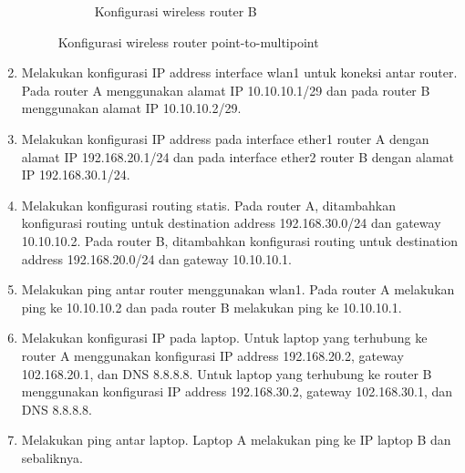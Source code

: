 \begin{enumerate}
\begin{figure}[H]
\begin{subfigure}[b]{0.4\linewidth}
			\caption{Konfigurasi wireless router B\label{fig:konfigurasiR2}}
		\end{subfigure}
		\caption{Konfigurasi wireless router point-to-multipoint}
		\hspace{1cm}
	\end{figure}
	\item Melakukan konfigurasi IP address interface wlan1 untuk koneksi antar router. Pada router A menggunakan alamat IP 10.10.10.1/29 dan pada router B menggunakan alamat IP 10.10.10.2/29.
	
	\item Melakukan konfigurasi IP address pada interface ether1 router A dengan alamat IP 192.168.20.1/24 dan pada interface ether2 router B dengan alamat IP 192.168.30.1/24.
	\item Melakukan konfigurasi routing statis. Pada router A, ditambahkan konfigurasi routing untuk destination address 192.168.30.0/24 dan gateway 10.10.10.2. Pada router B, ditambahkan konfigurasi routing untuk destination address 192.168.20.0/24 dan gateway 10.10.10.1.
	\item Melakukan ping antar router menggunakan wlan1. Pada router A melakukan ping ke 10.10.10.2 dan pada router B melakukan ping ke 10.10.10.1.
	\item Melakukan konfigurasi IP pada laptop. Untuk laptop yang terhubung ke router A menggunakan konfigurasi IP address 192.168.20.2, gateway 102.168.20.1, dan DNS 8.8.8.8. Untuk laptop yang terhubung ke router B menggunakan konfigurasi IP address 192.168.30.2, gateway 102.168.30.1, dan DNS 8.8.8.8.
	\item Melakukan ping antar laptop. Laptop A melakukan ping ke IP laptop B dan sebaliknya.
\end{enumerate}

